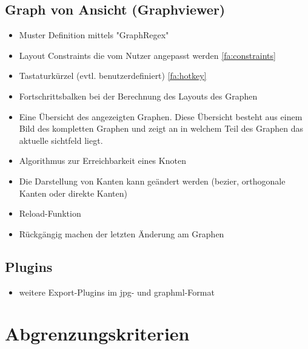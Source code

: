 \subsection{Graph von Ansicht (Graphviewer)}
  \begin{itemize}
    \item Muster Definition mittels "GraphRegex" %
    \item Layout Constraints die vom Nutzer angepasst werden \ref{fa:constraints} %
    \item Tastaturkürzel (evtl. benutzerdefiniert) \ref{fa:hotkey}
    \item Fortschrittsbalken bei der Berechnung des Layouts des Graphen %
    \item Eine Übersicht des angezeigten Graphen. Diese Übersicht besteht aus einem Bild des kompletten Graphen und zeigt an in welchem Teil des Graphen das aktuelle \gls{sichtfeld} liegt.  %
    \item Algorithmus zur Erreichbarkeit eines Knoten %
    \item Die Darstellung von Kanten kann geändert werden (\gls{bezier}, orthogonale Kanten oder direkte Kanten) %
    \item Reload-Funktion  %
    \item Rückgängig machen der letzten Änderung am Graphen %
  \end{itemize}

\subsection{Plugins}
  \begin{itemize}
    \item weitere Export-Plugins im \gls{jpg}- und \gls{graphml}-Format %
  \end{itemize}
  
\section{Abgrenzungskriterien}

